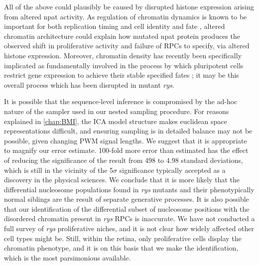 \documentclass{ut-thesis}
\begin{document}
\begin{NoHyper}
All of the above could plausibly be caused by disrupted histone expression arising from altered npat activity. As regulation of chromatin dynamics is known to be important for both replication timing \cite{Gilbert2010} and cell identity and fate \cite{Serrano2013}, altered chromatin architecture could explain how mutated npat protein produces the observed shift in proliferative activity and failure of RPCs to specify, via altered histone expression. Moreover, chromatin density has recently been specifically implicated as fundamentally involved in the process by which pluripotent cells restrict gene expression to achieve their stable specified fates \cite{Golkaram2017}; it may be this overall process which has been disrupted in mutant \textit{rys}.

It is possible that the sequence-level inference is compromised by the ad-hoc nature of the sampler used in our nested sampling procedure. For reasons explained in \autoref{chap:BMI}, the ICA model structure makes euclidean space representations difficult, and ensuring sampling is in detailed balance may not be possible, given changing PWM signal lengths. We suggest that it is appropriate to magnify our error estimate. 100-fold more error than estimated has the effect of reducing the significance of the result from 498 to 4.98 standard deviations, which is still in the vicinity of the 5$\sigma$ significance typically accepted as a discovery in the physical sciences. We conclude that it is more likely that the differential nucleosome populations found in \textit{rys} mutants and their phenotypically normal siblings are the result of separate generative processes. It is also possible that our identification of the differential subset of nucleosome positions with the disordered chromatin present in \textit{rys} RPCs is inaccurate. We have not conducted a full survey of \textit{rys} proliferative niches, and it is not clear how widely affected other cell types might be. Still, within the retina, only proliferative cells display the chromatin phenotype, and it is on this basis that we make the identification, which is the most parsimonious available. 


\end{NoHyper}
\end{document}
